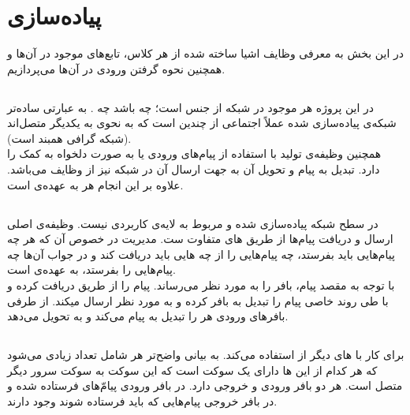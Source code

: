 \documentclass{article}
\begin{document}
\section{پیاده‌سازی}
در این بخش به معرفی وظایف اشیا ساخته شده از هر کلاس، تابع‌های موجود در آن‌ها و همچنین نحوه گرفتن ورودی در آن‌ها می‌پردازیم.

\subsection{}
در این پروژه هر  موجود در شبکه از جنس  است؛ چه  باشد چه . به عبارتی ساده‌تر شبکه‌ی پیاده‌سازی شده عملاً اجتماعی از چندین  است که به نحوی به یکدیگر متصل‌اند (شبکه گرافی همبند است).  \\
 همچنین وظیفه‌ی تولید  با استفاده از پیام‌های ورودی  یا به صورت دلخواه به کمک  را دارد. تبدیل  به پیام و تحویل آن به  جهت ارسال آن در شبکه نیز از وظایف  می‌باشد. علاوه بر این انجام  هر  به عهده‌ی  است.




\subsection{}   
 در سطح شبکه پیاده‌سازی شده و مربوط به لایه‌ی کاربردی نیست. وظیفه‌ی اصلی  ارسال و دریافت پیام‌ها از طریق های متفاوت ست. مدیریت در خصوص آن که هر  چه پیام‌هایی باید بفرستد، چه پیام‌هایی را از چه هایی باید دریافت کند و در جواب آن‌ها چه پیام‌هایی را بفرستد، به عهده‌ی  است. \\
 با توجه به مقصد پیام، بافر را به  مورد نظر می‌رساند.  پیام را از طریق  دریافت کرده و با طی روند خاصی پیام را تبدیل به بافر کرده و به  مورد نظر ارسال میکند. از طرفی بافر‌های ورودی هر  را تبدیل به پیام می‌کند و به  تحویل می‌دهد.




\subsection{}
 برای کار با های دیگر از  استفاده می‌کند. به بیانی واضح‌تر هر  شامل تعداد زیادی  می‌شود که هر کدام از این ها دارای یک سوکت است که این سوکت به سوکت سرور  دیگر متصل است. هر  دو بافر ورودی و خروجی دارد. در بافر ورودی پیام‌ّهای فرستاده شده و در بافر خروجی پیام‌هایی که باید فرستاده شوند وجود دارند.
\end{document}
